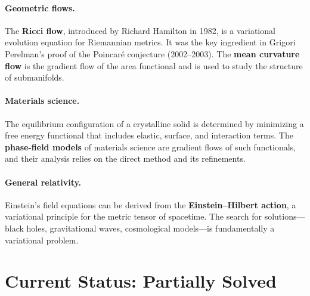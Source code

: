 \paragraph{Geometric flows.}
The \textbf{Ricci flow}, introduced by Richard Hamilton in 1982, is a variational evolution equation for Riemannian metrics. It was the key ingredient in Grigori Perelman's proof of the Poincar\'e conjecture (2002--2003). The \textbf{mean curvature flow} is the gradient flow of the area functional and is used to study the structure of submanifolds.

\paragraph{Materials science.}
The equilibrium configuration of a crystalline solid is determined by minimizing a free energy functional that includes elastic, surface, and interaction terms. The \textbf{phase-field models} of materials science are gradient flows of such functionals, and their analysis relies on the direct method and its refinements.

\paragraph{General relativity.}
Einstein's field equations can be derived from the \textbf{Einstein--Hilbert action}, a variational principle for the metric tensor of spacetime. The search for solutions---black holes, gravitational waves, cosmological models---is fundamentally a variational problem.

\section{Current Status: Partially Solved}

